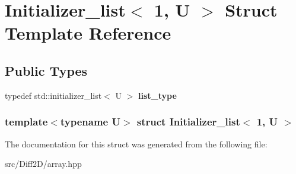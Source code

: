 \hypertarget{structInitializer__list_3_011_00_01U_01_4}{
\section{Initializer\_\-list$<$ 1, U $>$ Struct Template Reference}
\label{structInitializer__list_3_011_00_01U_01_4}
}
\subsection*{Public Types}
\begin{DoxyCompactItemize}
\item 
\hypertarget{structInitializer__list_3_011_00_01U_01_4_a84155c0e2c82ce1298dfa8ae00c670c6}{
typedef std::initializer\_\-list$<$ U $>$ {\bfseries list\_\-type}}
\label{structInitializer__list_3_011_00_01U_01_4_a84155c0e2c82ce1298dfa8ae00c670c6}

\end{DoxyCompactItemize}
\subsubsection*{template$<$typename U$>$ struct Initializer\_\-list$<$ 1, U $>$}



The documentation for this struct was generated from the following file:\begin{DoxyCompactItemize}
\item 
src/Diff2D/array.hpp\end{DoxyCompactItemize}
